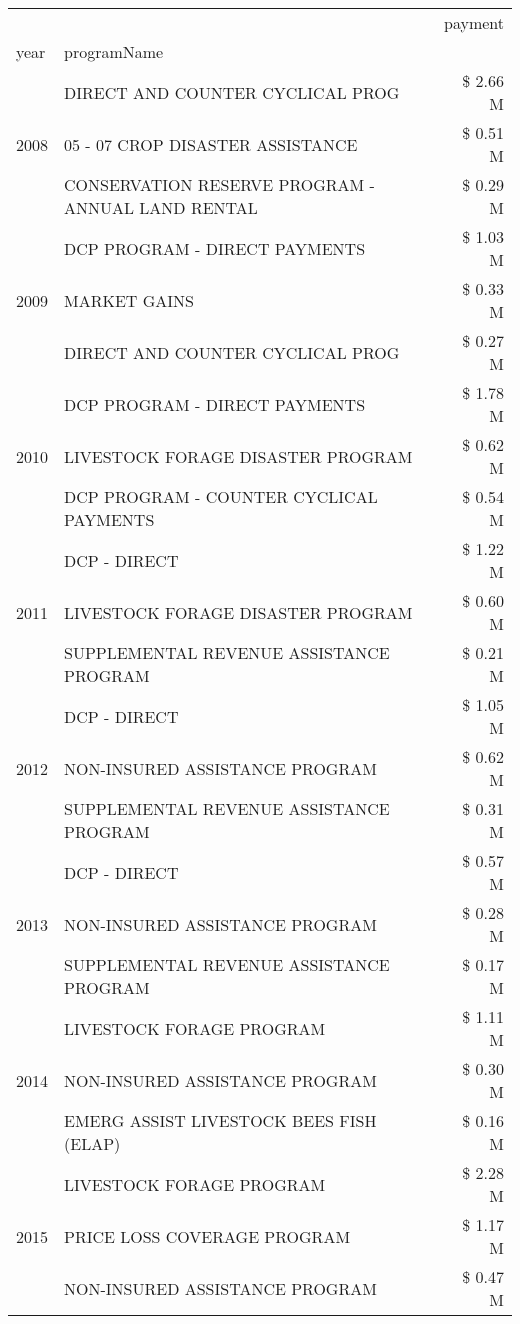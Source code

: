 \begin{tabular}{llr}
\toprule
 &  & payment \\
year & programName &  \\
\midrule
\multirow[t]{3}{*}{2008} & DIRECT AND COUNTER CYCLICAL PROG & \$ 2.66 M \\
 & 05 - 07 CROP DISASTER ASSISTANCE & \$ 0.51 M \\
 & CONSERVATION RESERVE PROGRAM - ANNUAL LAND RENTAL & \$ 0.29 M \\
\cline{1-3}
\multirow[t]{3}{*}{2009} & DCP PROGRAM - DIRECT PAYMENTS & \$ 1.03 M \\
 & MARKET GAINS & \$ 0.33 M \\
 & DIRECT AND COUNTER CYCLICAL PROG & \$ 0.27 M \\
\cline{1-3}
\multirow[t]{3}{*}{2010} & DCP PROGRAM - DIRECT PAYMENTS & \$ 1.78 M \\
 & LIVESTOCK FORAGE DISASTER  PROGRAM & \$ 0.62 M \\
 & DCP PROGRAM - COUNTER CYCLICAL PAYMENTS & \$ 0.54 M \\
\cline{1-3}
\multirow[t]{3}{*}{2011} & DCP - DIRECT & \$ 1.22 M \\
 & LIVESTOCK FORAGE DISASTER PROGRAM & \$ 0.60 M \\
 & SUPPLEMENTAL REVENUE ASSISTANCE PROGRAM & \$ 0.21 M \\
\cline{1-3}
\multirow[t]{3}{*}{2012} & DCP - DIRECT & \$ 1.05 M \\
 & NON-INSURED ASSISTANCE PROGRAM & \$ 0.62 M \\
 & SUPPLEMENTAL REVENUE ASSISTANCE PROGRAM & \$ 0.31 M \\
\cline{1-3}
\multirow[t]{3}{*}{2013} & DCP - DIRECT & \$ 0.57 M \\
 & NON-INSURED ASSISTANCE PROGRAM & \$ 0.28 M \\
 & SUPPLEMENTAL REVENUE ASSISTANCE PROGRAM & \$ 0.17 M \\
\cline{1-3}
\multirow[t]{3}{*}{2014} & LIVESTOCK FORAGE PROGRAM & \$ 1.11 M \\
 & NON-INSURED ASSISTANCE PROGRAM & \$ 0.30 M \\
 & EMERG ASSIST LIVESTOCK BEES FISH (ELAP) & \$ 0.16 M \\
\cline{1-3}
\multirow[t]{3}{*}{2015} & LIVESTOCK FORAGE PROGRAM & \$ 2.28 M \\
 & PRICE LOSS COVERAGE PROGRAM & \$ 1.17 M \\
 & NON-INSURED ASSISTANCE PROGRAM & \$ 0.47 M \\

\end{tabular}
